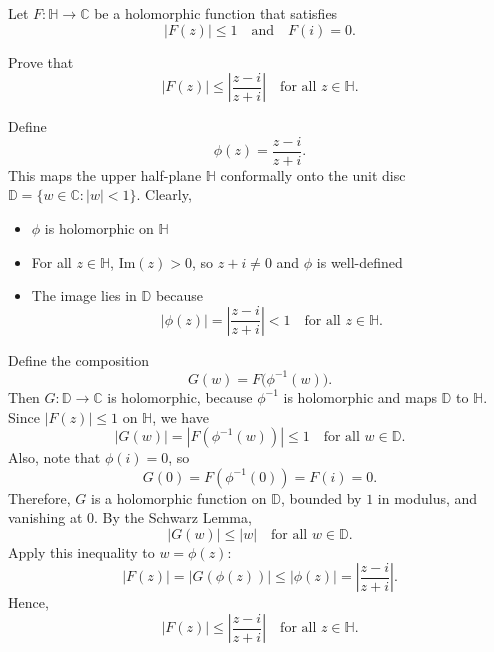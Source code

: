 \documentclass[12pt]{article}
\begin{document}
\begin{statement}[8.5.10]
    Let $F : \mathbb{H} \to \mathbb{C}$ be a holomorphic function that satisfies
        $$ |F(z)| \leq 1 \quad \text{and} \quad F(i) = 0. $$
    \par Prove that
        $$ |F(z)| \leq \left| \frac{z - i}{z + i} \right| \quad \text{for all } z \in \mathbb{H}. $$
\end{statement}
\begin{newproof}
    Define
    $$ \phi(z) = \frac{z - i}{z + i}. $$
    This maps the upper half-plane $\mathbb{H}$ conformally onto the unit disc $\mathbb{D} = \{ w \in \mathbb{C} : |w| < 1 \}$.
    Clearly,
    \begin{itemize}
        \item $\phi$ is holomorphic on $\mathbb{H}$
        \item For all $z \in \mathbb{H}$, $\text{Im}(z) > 0$, so $z + i \neq 0$ and $\phi$ is well-defined
        \item The image lies in $\mathbb{D}$ because 
            $$ |\phi(z)| = \left| \frac{z - i}{z + i} \right| < 1 \quad \text{for all } z \in \mathbb{H}. $$
    \end{itemize}
    Define the composition
    $$ G(w) = F\bigl(\phi^{-1}(w)\bigr). $$
    Then $G : \mathbb{D} \to \mathbb{C}$ is holomorphic, because $\phi^{-1}$ is holomorphic and maps $\mathbb{D}$ to $\mathbb{H}$. Since $|F(z)| \leq 1$ on $\mathbb{H}$, we have
    $$ |G(w)| = |F(\phi^{-1}(w))| \leq 1 \quad \text{for all } w \in \mathbb{D}. $$
    Also, note that $\phi(i) = 0$, so
    $$ G(0) = F(\phi^{-1}(0)) = F(i) = 0. $$
    Therefore, $G$ is a holomorphic function on $\mathbb{D}$, bounded by $1$ in modulus, and vanishing at $0$. By the Schwarz Lemma,
    $$ |G(w)| \leq |w| \quad \text{for all } w \in \mathbb{D}. $$
    Apply this inequality to $w = \phi(z)$:
    $$ |F(z)| = |G(\phi(z))| \leq |\phi(z)| = \left| \frac{z - i}{z + i} \right|. $$
    Hence,
    $$ |F(z)| \leq \left| \frac{z - i}{z + i} \right| \quad \text{for all } z \in \mathbb{H}. $$
\end{newproof}
\end{document}
